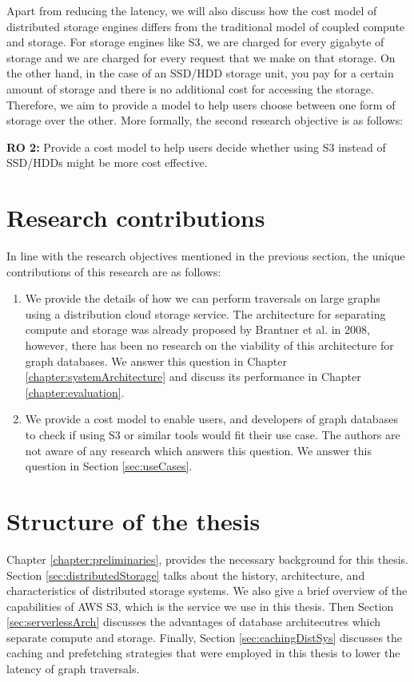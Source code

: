 \medskip
Apart from reducing the latency, we will also discuss how the cost model of
distributed storage engines differs from the traditional model of coupled
compute and storage. For storage engines like S3, we are charged for every
gigabyte of storage and we are charged for every request that we make on that
storage. On the other hand, in the case of an SSD/HDD storage unit, you pay for a
certain amount of storage and there is no additional cost for accessing the
storage. Therefore, we aim to provide a model to help users choose between one
form of storage over the other. More formally, the second research objective is
as follows:
\begin{displayquote}
    \textbf{RO 2:} Provide a cost model to help users decide whether using S3
    instead of SSD/HDDs might be more cost effective.
\end{displayquote}

\section{Research contributions}
In line with the research objectives mentioned in the previous section, the 
unique contributions of this research are as follows:
\begin{enumerate}
    \item We provide the details of how we can perform traversals on large
        graphs using a distribution cloud storage service. The architecture for
        separating compute and storage was already proposed by Brantner et
        al.\cite{brantner2008building} in 2008, however, there has been no
        research on the viability of this architecture for graph databases. We
        answer this question in Chapter \ref{chapter:systemArchitecture} and
        discuss its performance in Chapter \ref{chapter:evaluation}.
    \item We provide a cost model to enable users, and developers of graph
        databases to check if using S3 or similar tools would fit their use case.
        The authors are not aware of any research which answers this question.
        We answer this question in Section \ref{sec:useCases}.
\end{enumerate}


\section{Structure of the thesis}

\medskip
Chapter \ref{chapter:preliminaries}, provides the necessary background for
this thesis. Section \ref{sec:distributedStorage} talks about the
history, architecture, and characteristics of distributed storage systems. We
also give a brief overview of the capabilities of AWS S3, which is the service
we use in this thesis. Then
Section \ref{sec:serverlessArch} discusses the advantages of database
architecutres which separate compute and storage. Finally, 
Section \ref{sec:cachingDistSys} discusses the caching and prefetching
strategies that were employed in this thesis to lower the latency of graph
traversals.

